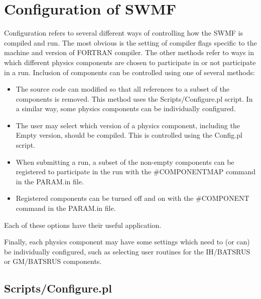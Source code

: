 \section{Configuration of SWMF}

Configuration refers to several different ways of controlling how the 
SWMF is compiled and run.  The most obvious is the setting of
compiler flags specific to the machine and version of FORTRAN
compiler.  The other methods refer to ways in which different physics
components are chosen to participate in or not participate in a run.
Inclusion of components can be controlled using one of several methods:

\begin{itemize}
\item The source code can modified so that all references %
      to a subset of the components is removed. 
      This method uses the Scripts/Configure.pl script.
      In a similar way, some physics components can be individually
      configured.                                         %
\item The user may select which version of a physics component,
      including the Empty version,
      should be compiled.  This is controlled using the Config.pl script.
\item When submitting a run, a subset of the non-empty components can be
      registered to participate in the run with the \#COMPONENTMAP command
      in the PARAM.in file.
\item Registered components can be turned off and on with the \#COMPONENT
      command in the PARAM.in file.
\end{itemize}
Each of these options have their useful application.

Finally, each physics component may have some settings which need to
(or can) be individually
configured, such as selecting user routines for the IH/BATSRUS or
GM/BATSRUS components.

\subsection{Scripts/Configure.pl}

